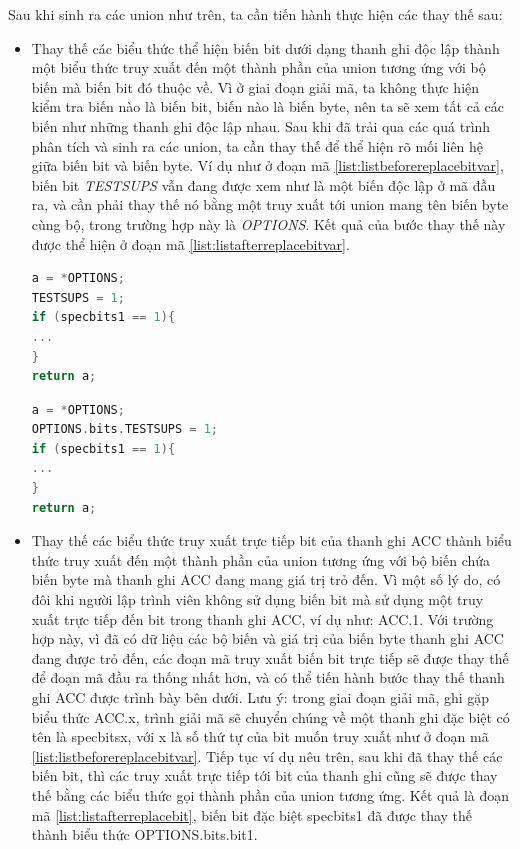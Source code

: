 Sau khi sinh ra các union như trên, ta cần tiến hành thực hiện các thay thế sau:
\begin{itemize}
\item Thay thế các biểu thức thể hiện biến bit dưới dạng thanh ghi độc lập thành một biểu thức truy xuất đến một thành phần của union tương ứng với bộ biến mà biến bit đó thuộc về. Vì ở giai đoạn giải mã, ta không thực hiện kiểm tra biến nào là biến bit, biến nào là biến byte, nên ta sẽ xem tất cả các biến như những thanh ghi độc lập nhau. Sau khi đã trải qua các quá trình phân tích và sinh ra các union, ta cần thay thế để thể hiện rõ mối liên hệ giữa biến bit và biến byte. Ví dụ như ở đoạn mã \ref{list:listbeforereplacebitvar}, biến bit \textit{TESTSUPS} vẫn đang được xem như là một biến độc lập ở mã đầu ra, và cần phải thay thế nó bằng một truy xuất tới union mang tên biến byte cùng bộ, trong trường hợp này là \textit{OPTIONS}. Kết quả của bước thay thế này được thể hiện ở đoạn mã \ref{list:listafterreplacebitvar}.
\begin{lstlisting}[caption={Mã đầu ra trước khi thực hiện các bước thay thế},label={list:listbeforereplacebitvar}, language = c]
a = *OPTIONS;
TESTSUPS = 1;
if (specbits1 == 1){
...
}
return a;
\end{lstlisting}

\begin{lstlisting}[caption={Mã đầu ra sau khi thực hiện bước thay thế biến bit},label={list:listafterreplacebitvar}, language = c]
a = *OPTIONS;
OPTIONS.bits.TESTSUPS = 1;
if (specbits1 == 1){
...
}
return a;
\end{lstlisting}
\item Thay thế các biểu thức truy xuất trực tiếp bit của thanh ghi ACC thành biểu thức truy xuất đến một thành phần của union tương ứng với bộ biến chứa biến byte mà thanh ghi ACC đang mang giá trị trỏ đến. Vì một số lý do, có đôi khi người lập trình viên không sử dụng biến bit mà sử dụng một truy xuất trực tiếp đến bit trong thanh ghi ACC, ví dụ như: ACC.1. Với trường hợp này, vì đã có dữ liệu các bộ biến và giá trị của biến byte thanh ghi ACC đang được trỏ đến, các đoạn mã truy xuất biến bit trực tiếp sẽ được thay thế để đoạn mã đầu ra thống nhất hơn, và có thể tiến hành bước thay thế thanh ghi ACC được trình bày bên dưới. Lưu ý: trong giai đoạn giải mã, ghi gặp biểu thức ACC.x, trình giải mã sẽ chuyển chúng về một thanh ghi đặc biệt có tên là specbitsx, với x là số thứ tự của bit muốn truy xuất như ở đoạn mã \ref{list:listbeforereplacebitvar}. Tiếp tục ví dụ nêu trên, sau khi đã thay thế các biến bit, thì các truy xuất trực tiếp tới bit của thanh ghi cũng sẽ được thay thế bằng các biểu thức gọi thành phần của union tương ứng. Kết quả là đoạn mã \ref{list:listafterreplacebit}, biến bit đặc biệt specbits1 đã được thay thế thành biểu thức OPTIONS.bits.bit1.


\end{itemize}

